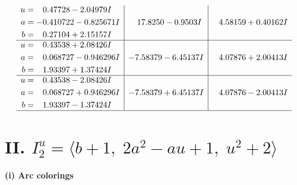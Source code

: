 \documentclass[1p]{elsarticle_modified}
\theoremstyle{definition}
\begin{document}
$$\begin{array}{c|c|c}
\begin{aligned}
u &= \phantom{-}0.47728 - 2.04979 I \\
a &= -0.410722 - 0.825671 I \\
b &= \phantom{-}0.27104 + 2.15157 I\end{aligned}
 & \phantom{-}17.8250 - 0.9503 I & \phantom{-}4.58159 + 0.40162 I \\ \hline\begin{aligned}
u &= \phantom{-}0.43538 + 2.08426 I \\
a &= \phantom{-}0.068727 - 0.946296 I \\
b &= \phantom{-}1.93397 + 1.37424 I\end{aligned}
 & -7.58379 - 6.45137 I & \phantom{-}4.07876 + 2.00413 I \\ \hline\begin{aligned}
u &= \phantom{-}0.43538 - 2.08426 I \\
a &= \phantom{-}0.068727 + 0.946296 I \\
b &= \phantom{-}1.93397 - 1.37424 I\end{aligned}
 & -7.58379 + 6.45137 I & \phantom{-}4.07876 - 2.00413 I\\
 \hline 
 \end{array}$$\newpage\newpage\renewcommand{\arraystretch}{1}
\centering \section*{II. $I^u_{2}= \langle b+1,\;2 a^2- a u+1,\;u^2+2 \rangle$}
\flushleft \textbf{(i) Arc colorings}\\
\end{document}
